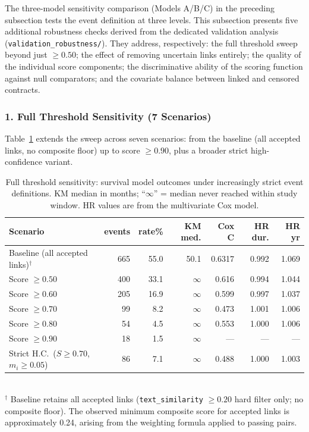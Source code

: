 \documentclass[12pt, a4paper]{article}
\begin{document}
The three-model sensitivity comparison (Models A/B/C) in the preceding
subsection tests the event definition at three levels. This subsection presents
five additional robustness checks derived from the dedicated validation analysis
(\texttt{validation\_robustness/}). They address, respectively: the full
threshold sweep beyond just $\geq 0.50$; the effect of removing uncertain links
entirely; the quality of the individual score components; the discriminative
ability of the scoring function against null comparators; and the covariate
balance between linked and censored contracts.

\subsubsection*{1. Full Threshold Sensitivity (7 Scenarios)}

Table~\ref{tab:threshold_full} extends the sweep across seven
scenarios: from the baseline (all accepted links, no composite floor) up to
score $\geq 0.90$, plus a broader strict high-confidence variant.

\begin{table}[H]
\centering
\caption{Full threshold sensitivity: survival model outcomes under increasingly
strict event definitions. KM median in months; ``$\infty$'' = median never
reached within study window. HR values are from the multivariate Cox model.}
\label{tab:threshold_full}
\scriptsize
\begin{tabular}{@{}p{4.0cm}rrrrrr@{}}
\toprule
\textbf{Scenario} & \textbf{events} & \textbf{rate\%} & \textbf{KM med.} &
\textbf{Cox C} & \textbf{HR dur.} & \textbf{HR yr} \\
\midrule
Baseline (all accepted links)$^\dagger$   & 665 & 55.0 & 50.1 & 0.6317 & 0.992 & 1.069 \\
Score $\geq 0.50$                          & 400 & 33.1 & $\infty$ & 0.616  & 0.994 & 1.044 \\
Score $\geq 0.60$                          & 205 & 16.9 & $\infty$ & 0.599  & 0.997 & 1.037 \\
Score $\geq 0.70$                          &  99 &  8.2 & $\infty$ & 0.473  & 1.001 & 1.006 \\
Score $\geq 0.80$                          &  54 &  4.5 & $\infty$ & 0.553  & 1.000 & 1.006 \\
Score $\geq 0.90$                          &  18 &  1.5 & $\infty$ & ---    & ---   & ---   \\
Strict H.C.\ ($S\!\geq\!0.70$, $m_i\!\geq\!0.05$) &  86 &  7.1 & $\infty$ & 0.488  & 1.000 & 1.003 \\
\bottomrule
\end{tabular}
\smallskip\\
{\footnotesize $^\dagger$ Baseline retains all accepted links
(\texttt{text\_similarity} $\geq 0.20$ hard filter only; no composite floor).
The observed minimum composite score for accepted links is approximately 0.24,
arising from the weighting formula applied to passing pairs.}
\end{table}
\end{document}
